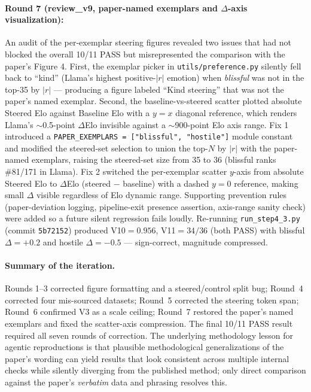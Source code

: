 \documentclass[11pt,a4paper]{article}
\begin{document}
\paragraph{Round 7 (review\_v9, paper-named exemplars and
$\Delta$-axis visualization):} An audit of the per-exemplar steering
figures revealed two issues that had not blocked the overall 10/11
PASS but misrepresented the comparison with the paper's Figure 4.
First, the exemplar picker in \texttt{utils/preference.py} silently
fell back to ``kind'' (Llama's highest positive-$|r|$ emotion) when
\emph{blissful} was not in the top-35 by $|r|$ --- producing a
figure labeled ``Kind steering'' that was not the paper's named
exemplar.  Second, the baseline-vs-steered scatter plotted absolute
Steered Elo against Baseline Elo with a $y{=}x$ diagonal reference,
which renders Llama's $\sim$0.5-point $\Delta$Elo invisible against
a $\sim$900-point Elo axis range.  Fix 1 introduced a
\texttt{PAPER\_EXEMPLARS = ["blissful", "hostile"]} module constant
and modified the steered-set selection to union the top-$N$ by $|r|$
with the paper-named exemplars, raising the steered-set size from
35 to 36 (blissful ranks \#81/171 in Llama).  Fix 2 switched the
per-exemplar scatter $y$-axis from absolute Steered Elo to
$\Delta$Elo (steered $-$ baseline) with a dashed $y{=}0$ reference,
making small $\Delta$ visible regardless of Elo dynamic range.
Supporting prevention rules (paper-deviation logging, pipeline-exit
presence assertion, axis-range sanity check) were added so a future
silent regression fails loudly.  Re-running \texttt{run\_step4\_3.py}
(commit \texttt{5b72152}) produced V10$=0.956$, V11$=34/36$ (both
PASS) with blissful $\Delta{=}{+}0.2$ and hostile
$\Delta{=}{-}0.5$ --- sign-correct, magnitude compressed.

\paragraph{Summary of the iteration.}  Rounds 1--3 corrected figure
formatting and a steered/control split bug; Round~4 corrected four
mis-sourced datasets; Round~5 corrected the steering token span;
Round~6 confirmed V3 as a scale ceiling; Round~7 restored the
paper's named exemplars and fixed the scatter-axis compression.
The final 10/11 PASS result required all seven rounds of correction.
The underlying methodology lesson for agentic reproductions is that
plausible methodological generalizations of the paper's wording can
yield results that look consistent across multiple internal checks
while silently diverging from the published method; only direct
comparison against the paper's \emph{verbatim} data and phrasing
resolves this.
\end{document}
